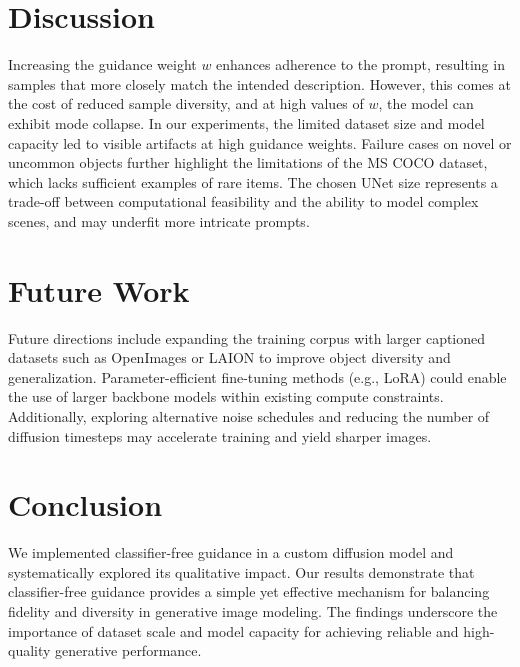 \documentclass[11pt,a4paper]{article}
\begin{document}

\section{Discussion}

Increasing the guidance weight $w$ enhances adherence to the prompt, resulting in samples that more closely match the intended description. However, this comes at the cost of reduced sample diversity, and at high values of $w$, the model can exhibit mode collapse. In our experiments, the limited dataset size and model capacity led to visible artifacts at high guidance weights. Failure cases on novel or uncommon objects further highlight the limitations of the MS COCO dataset, which lacks sufficient examples of rare items. The chosen UNet size represents a trade-off between computational feasibility and the ability to model complex scenes, and may underfit more intricate prompts.


\section{Future Work}

Future directions include expanding the training corpus with larger captioned datasets such as OpenImages or LAION to improve object diversity and generalization. Parameter-efficient fine-tuning methods (e.g., LoRA) could enable the use of larger backbone models within existing compute constraints. Additionally, exploring alternative noise schedules and reducing the number of diffusion timesteps may accelerate training and yield sharper images.


\section{Conclusion}

We implemented classifier-free guidance in a custom diffusion model and systematically explored its qualitative impact. Our results demonstrate that classifier-free guidance provides a simple yet effective mechanism for balancing fidelity and diversity in generative image modeling. The findings underscore the importance of dataset scale and model capacity for achieving reliable and high-quality generative performance.



\end{document}
